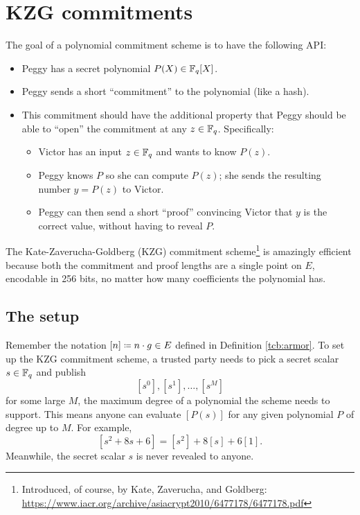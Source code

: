 \section{KZG commitments}\label{kzg}

The goal of a \alert{polynomial commitment scheme} is to have the
following API:

\begin{goal}{}{}
\begin{itemize}
\item Peggy has a secret polynomial $P(X) \in \mathbb{F}_{q}[X]$.
\item Peggy sends a short ``commitment'' to the polynomial (like a hash).
\item This commitment should have the additional property that Peggy should
  be able to ``open'' the commitment at any $z \in \mathbb{F}_{q}$.
  Specifically:
  \begin{itemize}
  \item Victor has an input $z \in \mathbb{F}_{q}$ and wants to know
    $P(z)$.
  \item Peggy knows $P$ so she can compute $P(z)$; she sends the
    resulting number $y = P(z)$ to Victor.
  \item Peggy can then send a short ``proof'' convincing Victor that $y$
    is the correct value, without having to reveal $P$.
  \end{itemize}
\end{itemize}
\end{goal}

The \alert{Kate-Zaverucha-Goldberg (KZG)} commitment scheme\footnote{Introduced,
of course, by Kate, Zaverucha, and Goldberg: \\ \url{https://www.iacr.org/archive/asiacrypt2010/6477178/6477178.pdf}}
is amazingly
efficient because both the commitment and proof lengths are a single
point on $E$, encodable in 256 bits, no matter how many coefficients
the polynomial has.

\subsection{The setup}

Remember the notation $[n] \defeq n \cdot g \in E$ defined in
Definition \ref{tcb:armor}. To set up the KZG commitment scheme, a trusted party needs
to pick a secret scalar $s \in \mathbb{F}_{q}$ and publish
\[ [s^0], [s^1], \dots, [s^M] \]
for some large $M$, the maximum degree of a polynomial the scheme
needs to support. This means anyone can evaluate
$[ P(s) ]$ for any given polynomial $P$ of
degree up to $M$. For example,
\[ [s^2 + 8s + 6] = [s^2] + 8[s] + 6[1].\]
Meanwhile, the secret scalar $s$ is never revealed to anyone.

